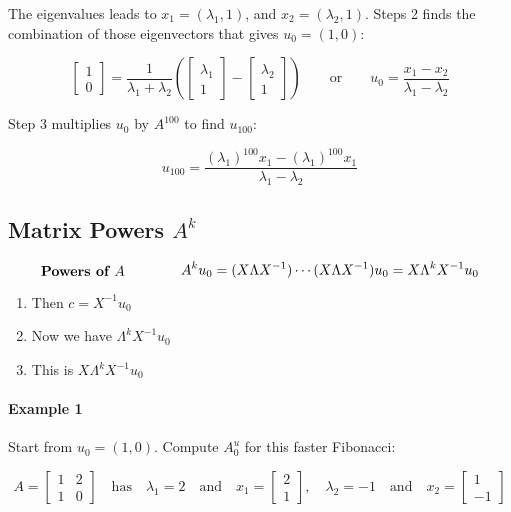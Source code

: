 \documentclass{article}
\begin{document}
The eigenvalues leads to $x_1=(\lambda_1, 1)$, and $x_2=(\lambda_2, 1)$. Steps 2 finds the combination of those eigenvectors that gives $u_0=(1,0)$:

\[
	\begin{bmatrix}
		1 \\
		0
	\end{bmatrix} =
	\frac{1}{\lambda_1+\lambda_2}
	\left(
	\begin{bmatrix}
			\lambda_1 \\
			1
		\end{bmatrix} -
	\begin{bmatrix}
			\lambda_2 \\
			1
		\end{bmatrix}
	\right)
	\qquad \text{or} \qquad
	u_0=\frac{x_1-x_2}{\lambda_1-\lambda_2}
\]

Step 3 multiplies $u_0$ by $A^{100}$ to find $u_{100}$:

\[
	u_{100}=\frac{(\lambda_1)^{100}x_1-(\lambda_1)^{100}x_1}{\lambda_1-\lambda_2}
\]

\subsection{Matrix Powers $A^k$}

\[
	\parbox{10em}{\textbf{Powers of $A$}}
	A^ku_0=(X\Lambda X^{-1})\cdots(X\Lambda X^{-1})u_0=X\Lambda^kX^{-1}u_0
\]

\begin{enumerate}
	\item {} Then $c = X^{-1}u_0$
	\item {} Now we have $\Lambda^k X^{-1}u_0$
	\item {}  This is $X\Lambda^kX^{-1}u_0$
\end{enumerate}

\paragraph{Example 1}

Start from $u_0=(1,0)$. Compute $A^u_0$ for this faster Fibonacci:

\[
	A=
	\begin{bmatrix}
		1 & 2 \\
		1 & 0
	\end{bmatrix}
	\quad \text{has} \quad
	\lambda_1=2
	\quad \text{and} \quad
	x_1=
	\begin{bmatrix}
		2 \\
		1
	\end{bmatrix},
	\quad \lambda_2=-1
	\quad \text{and} \quad
	x_2=
	\begin{bmatrix}
		1 \\
		-1
	\end{bmatrix}
\]
\end{document}
